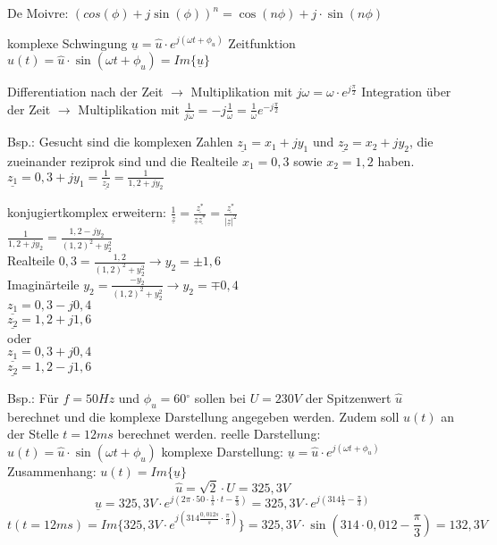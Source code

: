 \documentclass[german]{article}
\newcommand{\degree}{\ensuremath{^\circ}}
\begin{document}
De Moivre:
$(cos(\phi) + j \sin(\phi))^n = \cos(n\phi) + j \cdot \sin(n \phi)$

komplexe Schwingung $\underline{u} = \hat{u} \cdot e^{j(\omega t + \phi_u)}$
Zeitfunktion $u(t) = \hat{u} \cdot \sin(\omega t + \phi_u) = Im\{\underline{u}\}$

Differentiation nach der Zeit $\rightarrow$ Multiplikation mit $j \omega = \omega \cdot e^{j \frac{\pi}2}$
Integration über der Zeit $\rightarrow$ Multiplikation mit $\frac1{j \omega} = -j \frac1{\omega} = \frac1{\omega} e^{-j \frac{\pi}2}$

Bsp.: Gesucht sind die komplexen Zahlen $\underline{z_1} = x_1 + jy_1$ und $\underline{z_2} = x_2 + jy_2$, die zueinander reziprok sind und die Realteile $x_1 = 0,3$ sowie $x_2 = 1,2$ haben.
$\underline{z_1} = 0,3 + jy_1 = \frac1{\underline{z_2}} = \frac1{1,2 + jy_2}$

konjugiertkomplex erweitern: $\frac1{\underline{z}} = \frac{\underline{z^*}}{\underline{z}\underline{z^*}} = \frac{\underline{z^*}}{|\underline{z}|^2}$ \\
$\frac1{1,2 + jy_2} = \frac{1,2 - jy_2}{(1,2)^2 + y_2^2}$ \\
Realteile $0,3 = \frac{1,2}{(1,2)^2 + y_2^2} \rightarrow y_2 = \pm 1,6$ \\
Imaginärteile $y_2 = \frac{-y_2}{(1,2)^2 + y_2^2} \rightarrow y_2 = \mp 0,4$ \\

$\underline{z_1} = 0,3 - j0,4$ \\
$\underline{z_2} = 1,2 + j1,6$ \\
oder \\
$\underline{z_1} = 0,3 + j0,4$ \\
$\underline{z_2} = 1,2 - j1,6$

Bsp.: Für $f = 50 Hz$ und $\phi_u = 60 \degree$ sollen bei $U = 230V$ der Spitzenwert $\hat{u}$ berechnet und die komplexe Darstellung angegeben werden. Zudem soll $u(t)$ an der Stelle $t = 12ms$ berechnet werden.
reelle Darstellung: $u(t) = \hat{u} \cdot \sin(\omega t + \phi_u)$
komplexe Darstellung: $\underline{u} = \hat{u} \cdot e^{j(\omega t + \phi_u)}$
Zusammenhang: $u(t) = Im\{\underline{u}\}$
\[ \hat{u} = \sqrt{2} \cdot U = 325,3V \]
\[ \underline{u} = 325,3V \cdot e^{j(2\pi \cdot 50 \cdot \frac1s \cdot t - \frac{\pi}3)} = 325,3V \cdot e^{j(314 \frac1s - \frac{\pi}3)} \]
\[ t(t = 12ms) = Im\{ 325,3V \cdot e^{j(314 \frac{0,012s}{s} \cdot \frac{\pi}3)}\} = 325,3V \cdot \sin(314 \cdot 0,012 - \frac{\pi}3) = 132,3V \]

\end{document}
